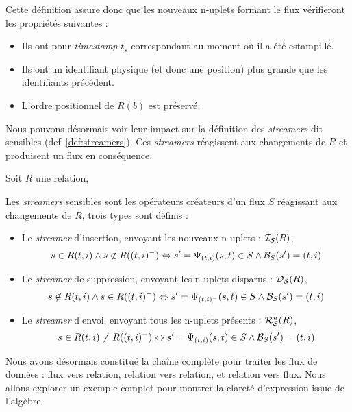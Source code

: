Cette définition assure donc que les nouveaux n-uplets formant le flux vérifieront les propriétés suivantes : 
\begin{itemize}
 \item Ils ont pour \textit{timestamp} $t_s$ correspondant au moment où il a été estampillé.
 \item Ils ont un identifiant physique (et donc une position) plus grande que les identifiants précédent.
 \item L'ordre positionnel de $R(b)$ est préservé.
\end{itemize}
Nous pouvons désormais voir leur impact sur la définition des \textit{streamers} dit sensibles (def~\ref{def:streamers}). Ces \textit{streamers} réagissent aux changements de $R$ et produisent un flux en conséquence.
\begin{defi}\label{def:streamers}
    Soit $R$ une relation,

    Les \textit{streamers} sensibles sont les opérateurs créateurs d'un flux $S$ réagissant aux changements de $R$, trois types sont définis :
\begin{itemize}
 \item Le \textit{streamer} d'insertion, envoyant les nouveaux n-uplets : $\mathcal{I_S}(R)$, $$s\in R(t,i) \wedge s\not\in R((t,i)^-) \Leftrightarrow s'=\Psi_{(t,i)}(s,t)\in S \wedge \mathcal{B}_S(s') = (t,i)$$
 \item Le \textit{streamer} de suppression, envoyant les n-uplets disparus : $\mathcal{D_S}(R)$, $$s\not\in R(t,i) \wedge s\in R((t,i)^-) \Leftrightarrow s'=\Psi_{(t,i)^-}(s,t)\in S \wedge \mathcal{B}_S(s') = (t,i)$$
 \item Le \textit{streamer} d'envoi, envoyant tous les n-uplets présents : $\mathcal{R}_{\mathcal S}^{u}(R)$, $$s\in R(t,i) \neq R((t,i)^-) \Leftrightarrow s'=\Psi_{(t,i)}(s,t)\in S \wedge \mathcal{B}_S(s') = (t,i)$$
\end{itemize}
\end{defi}

Nous avons désormais constitué la chaîne complète pour traiter les flux de données : flux vers relation, relation vers relation, et relation vers flux. Nous allons explorer un exemple complet pour montrer la clareté d'expression issue de l'algèbre.

